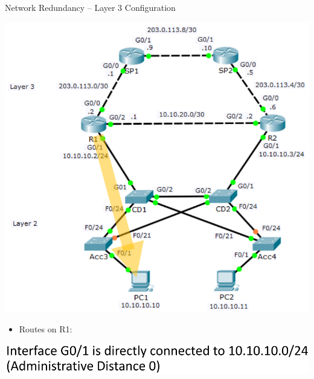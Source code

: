 \documentclass[pdflatex,compress,mathserif]{beamer}
\begin{document}
\begin{frame}{Network Redundancy – Layer 3 Configuration}
	\begin{multicols}{2}
		\begin{center}
			\includegraphics[width=\linewidth]{img/img06}
		\end{center}
		\columnbreak
		\begin{itemize}
			\item Routes on R1:
		\end{itemize}
		\begin{center}
			\includegraphics[width=\linewidth]{img/img07}
		\end{center}
	\end{multicols}
\end{frame}
\end{document}
